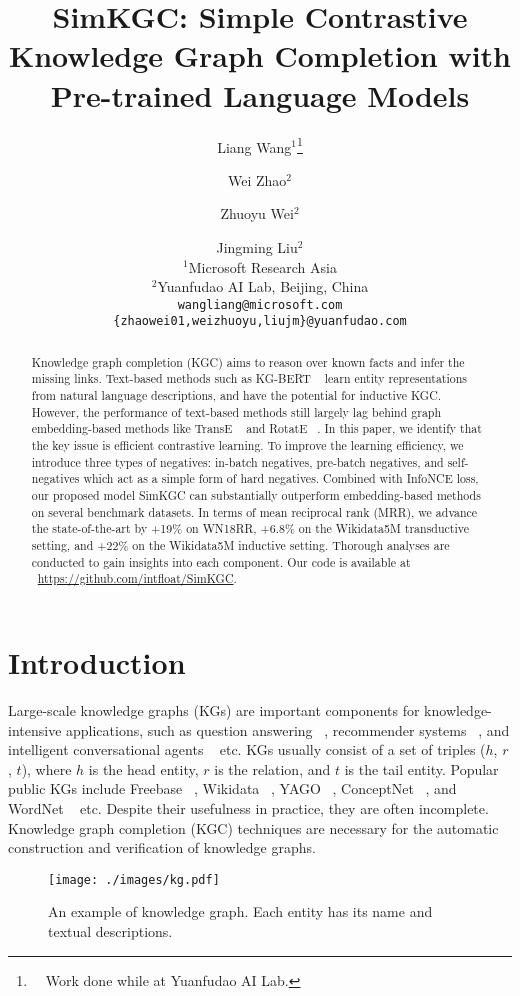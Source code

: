 \documentclass[11pt]{article}
\title{SimKGC: Simple Contrastive Knowledge Graph Completion with \\ Pre-trained Language Models}
\author{Liang Wang$^1$\thanks{\ \ Work done while at Yuanfudao AI Lab.} \and Wei Zhao$^2$ \and Zhuoyu Wei$^2$ \and Jingming Liu$^2$ \\
        $^1$Microsoft Research Asia \\
        $^2$Yuanfudao AI Lab, Beijing, China \\
    {\tt wangliang@microsoft.com} \\ {\tt \{zhaowei01,weizhuoyu,liujm\}@yuanfudao.com} \\}
\begin{document}
\maketitle
\begin{abstract}
Knowledge graph completion (KGC) aims to reason over known facts
and infer the missing links.
Text-based methods such as KG-BERT ~\citep{yao2019kg}
learn entity representations from natural language descriptions,
and have the potential for inductive KGC.
However,
the performance of text-based methods still largely lag behind
graph embedding-based methods
like TransE ~\citep{bordes2013translating} and RotatE ~\citep{sun2018rotate}.
In this paper,
we identify that the key issue is efficient contrastive learning.
To improve the learning efficiency,
we introduce three types of negatives:
in-batch negatives,
pre-batch negatives,
and self-negatives which act as a simple form of hard negatives.
Combined with InfoNCE loss,
our proposed model SimKGC can substantially outperform embedding-based methods
on several benchmark datasets.
In terms of mean reciprocal rank (MRR),
we advance the state-of-the-art by +19\% on WN18RR,
+6.8\% on the Wikidata5M transductive setting,
and +22\% on the Wikidata5M inductive setting.
Thorough analyses are conducted to gain insights into each component.
Our code is available at ~\url{https://github.com/intfloat/SimKGC}.
\end{abstract}

\section{Introduction}
Large-scale knowledge graphs (KGs) are important components for knowledge-intensive applications,
such as question answering ~\citep{sun-etal-2019-pullnet},
recommender systems ~\citep{Huang2018ImprovingSR},
and intelligent conversational agents ~\citep{Dinan2019WizardOW} etc.
KGs usually consist of a set of triples ($h$, $r$, $t$),
where $h$ is the head entity, $r$ is the relation, and $t$ is the tail entity.
Popular public KGs include Freebase ~\citep{bollacker2008freebase},
Wikidata ~\citep{vrandevcic2014wikidata},
YAGO ~\citep{suchanek2007yago},
ConceptNet ~\citep{speer2017conceptnet},
and WordNet ~\citep{miller1995wordnet} etc.
Despite their usefulness in practice,
they are often incomplete.
Knowledge graph completion (KGC) techniques are necessary for the automatic construction
and verification of knowledge graphs.

\begin{figure}[ht]
\begin{center}
 \texttt{[image: ./images/kg.pdf]}
 \caption{An example of knowledge graph.
 Each entity has its name and textual descriptions.}
 \label{fig:kg}
\end{center}
\end{figure}
\end{document}

